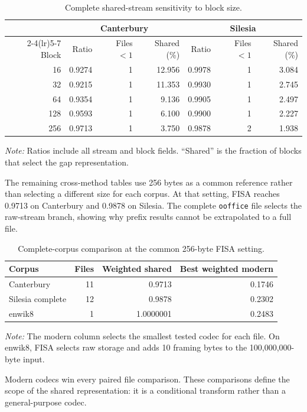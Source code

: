 \documentclass[a4paper,fleqn]{cas-dc}
\newcommand{\tablenote}[1]{%
  \par\smallskip
  \begin{minipage}{0.98\linewidth}
  \footnotesize\textit{Note:} #1
  \end{minipage}}
\begin{document}
\begin{table}[t]
\caption{Complete shared-stream sensitivity to block size.}
\label{tab:block-sensitivity}
\centering
\begin{tabular}{rrrrrrr}
\toprule
& \multicolumn{3}{c}{Canterbury} & \multicolumn{3}{c}{Silesia}\\
\cmidrule(lr){2-4}\cmidrule(lr){5-7}
Block & Ratio & Files $<1$ & Shared (\%) & Ratio & Files $<1$ & Shared (\%)\\
\midrule
16  & 0.9274 & 1 & 12.956 & 0.9978 & 1 & 3.084\\
32  & 0.9215 & 1 & 11.353 & 0.9930 & 1 & 2.745\\
64  & 0.9354 & 1 &  9.136 & 0.9905 & 1 & 2.497\\
128 & 0.9593 & 1 &  6.100 & 0.9900 & 1 & 2.227\\
256 & 0.9713 & 1 &  3.750 & 0.9878 & 2 & 1.938\\
\bottomrule
\end{tabular}
\tablenote{Ratios include all stream and block fields. ``Shared'' is the
fraction of blocks that select the gap representation.}
\end{table}

The remaining cross-method tables use 256 bytes as a common reference rather
than selecting a different size for each corpus. At that setting, FISA reaches
0.9713 on Canterbury and 0.9878 on Silesia. The complete \texttt{ooffice}
file selects the raw-stream branch, showing why prefix results cannot be
extrapolated to a full file.

\begin{table}[t]
\caption{Complete-corpus comparison at the common 256-byte FISA setting.}
\label{tab:corpus}
\centering
\begin{tabular}{lrrr}
\toprule
Corpus & Files & Weighted shared & Best weighted modern\\
\midrule
Canterbury & 11 & 0.9713 & 0.1746\\
Silesia complete & 12 & 0.9878 & 0.2302\\
enwik8 & 1 & 1.0000001 & 0.2483\\
\bottomrule
\end{tabular}
\tablenote{The modern column selects the smallest tested codec for each file.
On enwik8, FISA selects raw storage and adds 10 framing bytes to the
100,000,000-byte input.}
\end{table}

Modern codecs win every paired file comparison. These comparisons define the
scope of the shared representation: it is a conditional transform rather than
a general-purpose codec.
\end{document}
